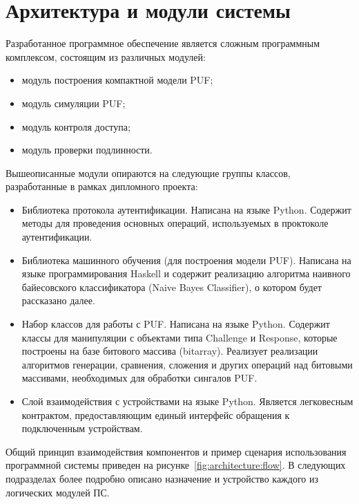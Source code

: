 \section{Архитектура и модули системы}

Разработанное программное обеспечение является сложным программным комплексом, состоящим из различных модулей:
\begin{itemize}
    \item модуль построения компактной модели PUF;
    \item модуль симуляции PUF;
    \item модуль контроля доступа;
    \item модуль проверки подлинности.
\end{itemize}

Вышеописанные модули опираются на следующие группы классов, разработанные в рамках дипломного проекта:
\begin{itemize}
    \item Библиотека протокола аутентификации. Написана на языке Python. Содержит методы для проведения основных операций, используемых в проктоколе аутентификации.
    \item Библиотека машинного обучения (для построения модели PUF). Написана на языке программирования Haskell и содержит реализацию алгоритма наивного байесовского классификатора (Naive Bayes Classifier), о котором будет рассказано далее.
    \item Набор классов для работы с PUF. Написана на языке Python. Содержит классы для манипуляции с объектами типа Challenge и Response, которые построены на базе битового массива (bitarray). Реализует реализации алгоритмов генерации, сравнения, сложения и других операций над битовыми массивами, необходимых для обработки сингалов PUF.
    \item Слой взаимодействия с устройствами на языке Python. Является легковесным контрактом, предоставляющим единый интерфейс обращения к подключенным устройствам.
\end{itemize}

Общий принцип взаимодействия компонентов и пример сценария использования программной системы приведен на рисунке~\ref{fig:architecture:flow}. В следующих подразделах более подробно описано назначение и устройство каждого из логических модулей ПС.



